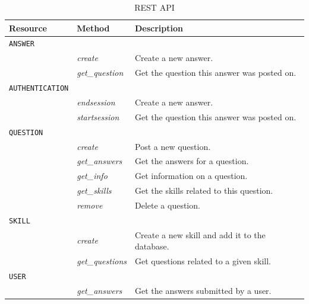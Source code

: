 \begin{table}
	\caption{REST API}\label{table:rest_api}
	
	\begin{center}
		\begin{tabular}{p{70px} | p{70px} | p{210px}}
				\hline
				\hline
				\textbf{Resource} 		& \textbf{Method}					&	\textbf{Description} 	\\
				\hline
				\hline
				\texttt{ANSWER}				& 												&	\\
				\hline
															& \emph{create}						& Create a new answer. \\
															& \emph{get\_question}		& Get the question this answer was posted on. \\
				\hline
				\texttt{AUTHENTICATION}		& 												&	\\
				\hline
															& \emph{endsession}				& Create a new answer. \\
															& \emph{startsession}			& Get the question this answer was posted on. \\
				\hline
				\texttt{QUESTION}			& 												& \\
				\hline
															& \emph{create}						& Post a new question. \\
															& \emph{get\_answers}			& Get the answers for a question. \\
															& \emph{get\_info}				& Get information on a question. \\
															& \emph{get\_skills}			& Get the skills related to this question. \\
															& \emph{remove}						& Delete a question. \\
				\hline
				\texttt{SKILL}				& 												& \\
				\hline
															& \emph{create}						& Create a new skill and add it to the database. \\
															& \emph{get\_questions}		& Get questions related to a given skill. \\
				\hline
				\texttt{USER}					&	\\
				\hline
															& \emph{get\_answers}			& Get the answers submitted by a user. \\

\end{tabular}
\end{center}
\end{table}
